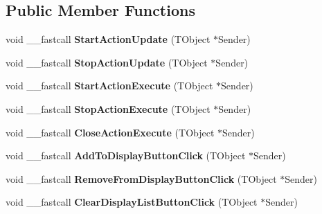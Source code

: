 \subsection*{Public Member Functions}
\begin{DoxyCompactItemize}
\item 
\hypertarget{class_t_run_dynamic_clamp_form_ab03c9033d9ecb26a60c5bf00e1faa5a8}{void \+\_\+\+\_\+fastcall {\bfseries Start\+Action\+Update} (T\+Object $\ast$Sender)}\label{class_t_run_dynamic_clamp_form_ab03c9033d9ecb26a60c5bf00e1faa5a8}

\item 
\hypertarget{class_t_run_dynamic_clamp_form_a45d05f75d4f7cb5e5684bcd9b1619986}{void \+\_\+\+\_\+fastcall {\bfseries Stop\+Action\+Update} (T\+Object $\ast$Sender)}\label{class_t_run_dynamic_clamp_form_a45d05f75d4f7cb5e5684bcd9b1619986}

\item 
\hypertarget{class_t_run_dynamic_clamp_form_a24e6032e5c7e32d7762a48cd4da639d6}{void \+\_\+\+\_\+fastcall {\bfseries Start\+Action\+Execute} (T\+Object $\ast$Sender)}\label{class_t_run_dynamic_clamp_form_a24e6032e5c7e32d7762a48cd4da639d6}

\item 
\hypertarget{class_t_run_dynamic_clamp_form_aa7e994758a90e6976dcefb43e08784b0}{void \+\_\+\+\_\+fastcall {\bfseries Stop\+Action\+Execute} (T\+Object $\ast$Sender)}\label{class_t_run_dynamic_clamp_form_aa7e994758a90e6976dcefb43e08784b0}

\item 
\hypertarget{class_t_run_dynamic_clamp_form_af3bfbdfeef75cf56f436a80e6083447c}{void \+\_\+\+\_\+fastcall {\bfseries Close\+Action\+Execute} (T\+Object $\ast$Sender)}\label{class_t_run_dynamic_clamp_form_af3bfbdfeef75cf56f436a80e6083447c}

\item 
\hypertarget{class_t_run_dynamic_clamp_form_a9a8a602e10f6bb9f3928cc6040f12af6}{void \+\_\+\+\_\+fastcall {\bfseries Add\+To\+Display\+Button\+Click} (T\+Object $\ast$Sender)}\label{class_t_run_dynamic_clamp_form_a9a8a602e10f6bb9f3928cc6040f12af6}

\item 
\hypertarget{class_t_run_dynamic_clamp_form_a7a14bf15b3d83463473d5a2690ea32b5}{void \+\_\+\+\_\+fastcall {\bfseries Remove\+From\+Display\+Button\+Click} (T\+Object $\ast$Sender)}\label{class_t_run_dynamic_clamp_form_a7a14bf15b3d83463473d5a2690ea32b5}

\item 
\hypertarget{class_t_run_dynamic_clamp_form_a57849d37edd05724646f2a19a6b5b3e9}{void \+\_\+\+\_\+fastcall {\bfseries Clear\+Display\+List\+Button\+Click} (T\+Object $\ast$Sender)}\label{class_t_run_dynamic_clamp_form_a57849d37edd05724646f2a19a6b5b3e9}


\end{DoxyCompactItemize}
